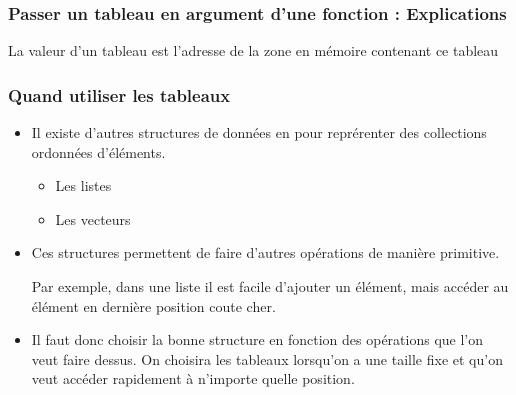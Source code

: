 \documentclass[aspectratio=169]{beamer}
\begin{document}
\begin{frame}[fragile]
  \frametitle{Passer un tableau en argument d'une fonction : Explications}

  \alert{La valeur d'un tableau est l'adresse de la zone en mémoire contenant ce
    tableau}



\end{frame}


\begin{frame}
  \frametitle{Quand utiliser les tableaux}
  \begin{itemize}
  \item Il existe d'autres structures de données en \Cpp pour reprérenter des
    collections ordonnées d'éléments.
    \begin{itemize}
    \item Les listes
    \item Les vecteurs
    \end{itemize}
  \item Ces structures permettent de faire d'autres opérations de manière
    primitive.

    \alert{Par exemple, dans une liste il est facile d'ajouter un élément, mais
      accéder au élément en dernière position coute cher.}
  \item Il faut donc choisir la bonne structure en fonction des opérations que
    l'on veut faire dessus. On choisira les tableaux lorsqu'on a une
    \alert{taille fixe} et qu'on veut accéder rapidement à \alert{n'importe
      quelle} position.
  \end{itemize}

\end{frame}
\end{document}
